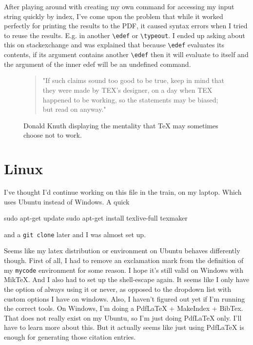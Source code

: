 \documentclass{article} \usepackage[utf8]{inputenc}
\newcommand{\code}[1]{\colorbox{codebggray}{{\texttt{#1}}}}
\begin{document}
After playing around with creating my own command for accessing my input string quickly by index, I've come upon the problem that while it worked perfectly for printing the results to the PDF, it caused syntax errors when I tried to reuse the results. E.g. in another \code{\textbackslash edef} or \code{\textbackslash typeout}. I ended up asking about this on stackexchange and was explained that because \code{\textbackslash edef} evaluates its contents, if its argument contains another \code{\textbackslash edef} then it will evaluate to itself and the argument of the inner edef will be an undefined command. 

\begin{figure}[htbp]
\begin{myquote}
\begin{quote}
"If such claims sound too good to be true, keep in
mind that they were made by TEX’s designer, on a day when TEX happened to
be working, so the statements may be biased; but read on anyway."
\end{quote}
\end{myquote}
\caption{Donald Knuth displaying the mentality that TeX may sometimes choose not to work.}
\end{figure}

\section{Linux}
I've thought I'd continue working on this file in the train, on my laptop. Which uses Ubuntu instead of Windows. A quick
\begin{mycode}
sudo apt-get update
sudo apt-get install texlive-full texmaker
\end{mycode}
and a \code{git clone} later and I was almost set up.

Seems like my latex distribution or environment on Ubuntu behaves differently though. First of all, I had to remove an exclamation mark from the definition of my \code{mycode} environment for some reason. I hope it's still valid on Windows with MikTeX.
And I also had to set up the shell-escape again. It seems like I only have the option of always using it or never, as opposed to the dropdown list with custom options I have on windows. Also, I haven't figured out yet if I'm running the correct tools. On Windows, I'm doing a PdfLaTeX + MakeIndex + BibTex. That does not really exist on my Ubuntu, so I'm just doing PdfLaTeX only. I'll have to learn more about this.
But it actually seems like just using PdfLaTeX is enough for generating those citation entries.
\end{document}
